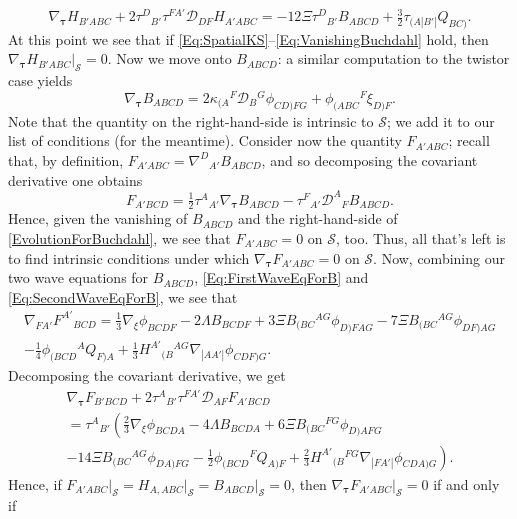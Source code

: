 \documentclass[10pt,a4paper]{article}
\theoremstyle{plain}
\begin{document}
\[ \nabla_{\bm\tau} H_{B'ABC} + 2 \tau^{D}{}_{B'} \tau^{FA'} \mathcal{D}_{DF}H_{A'ABC} = -12 \Xi \tau^{D}{}_{B'}B_{ABCD} + \tfrac{3}{2} \tau_{(A|B'|}Q_{BC)}.\]
At this point we see that if \eqref{Eq:SpatialKS}--\eqref{Eq:VanishingBuchdahl} hold, then $\nabla_{\bm\tau} H_{B'ABC}\big\vert_{\mathcal{S}}=0$. Now we move onto $B_{ABCD}$: a similar computation to the twistor case yields
\begin{equation}
    \nabla_{\bm\tau} B_{ABCD} = 2 \kappa_{(A}{}^{F}\mathcal{D}_{B}{}^{G}\phi_{CD)FG} + \phi_{(ABC}{}^{F}\xi_{D)F}.\label{EvolutionForBuchdahl}
\end{equation}
Note that the quantity on the right-hand-side is intrinsic to $\mathcal{S}$; we add it to our list of conditions (for the meantime). Consider now the quantity $F_{A'ABC}$; recall that, by definition, $F_{A'ABC}=\nabla^D{}_{A'}B_{ABCD}$, and so decomposing the covariant derivative one obtains
\[F_{A'BCD} = \tfrac{1}{2} \tau^{A}{}_{A'} \nabla_{\bm\tau} B_{ABCD}  -  \tau^{F}{}_{A'} \mathcal{D}^{A}{}_{F}B_{ABCD}.\]
Hence, given the vanishing of $B_{ABCD}$ and the right-hand-side of \eqref{EvolutionForBuchdahl}, we see that $F_{A'ABC}=0$ on $\mathcal{S}$, too. Thus, all that's left is to find intrinsic conditions under which $\nabla_{\bm\tau}F_{A'ABC}=0$ on $\mathcal{S}$. Now, combining our two wave equations for $B_{ABCD}$, \eqref{Eq:FirstWaveEqForB} and \eqref{Eq:SecondWaveEqForB}, we see that 
\begin{multline}
     \nabla_{FA'}F^{A'}{}_{BCD} = \tfrac{1}{3} \nabla_{\xi}{}\phi_{BCDF} - 2 \Lambda B_{BCDF} + 3\Xi B_{(BC}{}^{AG}  \phi_{D)FAG}  - 7 \Xi B_{(BC}{}^{AG}\phi_{DF)AG} \\-  \tfrac{1}{4} \phi_{(BCD}{}^{A}Q_{F)A} + \tfrac{1}{3} H^{A'}{}_{(B}{}^{AG}\nabla_{|AA'|}\phi_{CDF)G}\label{CurlOfFInTermsOfCollineation}. 
\end{multline}
Decomposing the covariant derivative, we get 
\begin{multline}
\nabla_{\bm\tau} F_{B'BCD} + 2 \tau^{A}{}_{B'} \tau^{FA'} \mathcal{D}_{AF}F_{A'BCD} \\
= \tau^{A}{}_{B'}\left(\tfrac{2}{3} \nabla_{\xi}{}\phi_{BCDA}  - 4 \Lambda  B_{BCDA} + 6 \Xi  B_{(BC}{}^{FG}  \phi_{D)AFG}  \right. \\ \left.  - 14 \Xi  B_{(BC}{}^{AG}\phi_{DA)FG}  -  \tfrac{1}{2}  \phi_{(BCD}{}^{F}Q_{A)F}   + \tfrac{2}{3}  H^{A'}{}_{(B}{}^{FG}\nabla_{|FA'|}\phi_{CDA)G}\right).
\end{multline}
Hence, if $F_{A'ABC}\big\vert_{\mathcal{S}}=H_{A,ABC}\big\vert_{\mathcal{S}}=B_{ABCD}\big\vert_{\mathcal{S}}=0$, then $\nabla_{\bm\tau}F_{A'ABC}\big\vert_{\mathcal{S}}=0$ if and only if  
\end{document}
